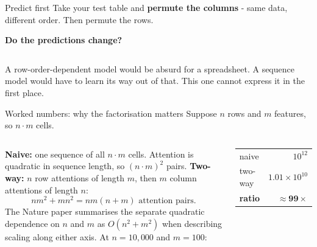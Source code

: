 \documentclass[aspectratio=169]{beamer}
\begin{document}
\begin{frame}{Predict first}
  \small
  Take your test table and \textbf{permute the columns} - same data, different order. Then
  permute the rows.
  \vskip 10pt
  \begin{center}
    \textbf{Do the predictions change?}
  \end{center}
  \vskip 10pt
  \pause
  \begin{columns}[T]
  \end{columns}
  \vskip 8pt
  \centering
  \footnotesize
  A row-order-dependent model would be absurd for a spreadsheet. A sequence model would have to
  learn its way out of that. This one cannot express it in the first place.
\end{frame}

\begin{frame}{Worked numbers: why the factorisation matters}
  \small
  Suppose $n$ rows and $m$ features, so $n \cdot m$ cells.
  \vskip 4pt
  \begin{columns}[T]
    \footnotesize
    \textbf{Naive:} one sequence of all $n\cdot m$ cells. Attention is quadratic in sequence
    length, so $(n \cdot m)^2$ pairs.
    \vskip 5pt
    \textbf{Two-way:} $n$ row attentions of length $m$, then $m$ column attentions of length $n$:
    $$n m^2 + m n^2 = nm(n+m) \text{ attention pairs.}$$
    The Nature paper summarises the separate quadratic dependence on $n$ and $m$ as
    $O(n^2+m^2)$ when describing scaling along either axis.
    \vskip 2pt
    \footnotesize
    At $n = 10{,}000$ and $m = 100$:
    \vskip 3pt
    \begin{center}
      \begin{tabular}{lr}
        \toprule
        naive & $10^{12}$ \\
        two-way & $1.01\times10^{10}$ \\
        \midrule
        \textbf{ratio} & $\mathbf{\approx 99\times}$ \\
        \bottomrule
      \end{tabular}
    \end{center}
    \vskip 4pt
  \end{columns}
\end{frame}
\end{document}
